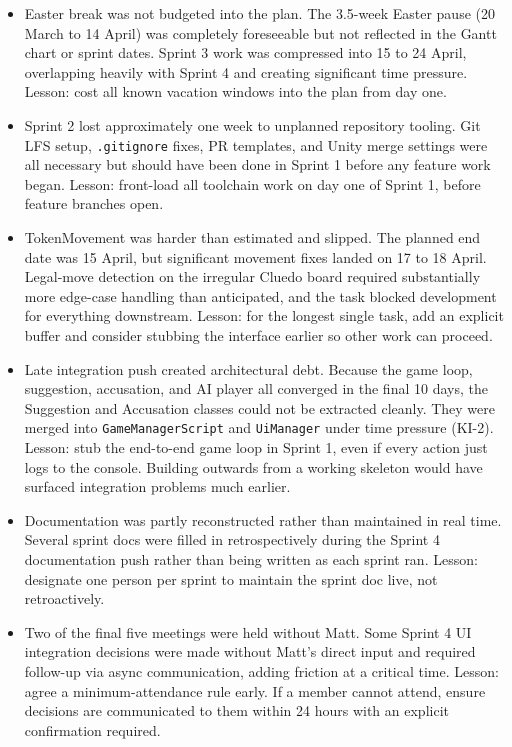 \begin{itemize}
    \item Easter break was not budgeted into the plan. The 3.5-week Easter pause (20 March to 14 April) was completely foreseeable but not reflected in the Gantt chart or sprint dates. Sprint 3 work was compressed into 15 to 24 April, overlapping heavily with Sprint 4 and creating significant time pressure. Lesson: cost all known vacation windows into the plan from day one.
    \item Sprint 2 lost approximately one week to unplanned repository tooling. Git LFS setup, \texttt{.gitignore} fixes, PR templates, and Unity merge settings were all necessary but should have been done in Sprint 1 before any feature work began. Lesson: front-load all toolchain work on day one of Sprint 1, before feature branches open.
    \item TokenMovement was harder than estimated and slipped. The planned end date was 15 April, but significant movement fixes landed on 17 to 18 April. Legal-move detection on the irregular Cluedo board required substantially more edge-case handling than anticipated, and the task blocked development for everything downstream. Lesson: for the longest single task, add an explicit buffer and consider stubbing the interface earlier so other work can proceed.
    \item Late integration push created architectural debt. Because the game loop, suggestion, accusation, and AI player all converged in the final 10 days, the Suggestion and Accusation classes could not be extracted cleanly. They were merged into \texttt{GameManagerScript} and \texttt{UiManager} under time pressure (KI-2). Lesson: stub the end-to-end game loop in Sprint 1, even if every action just logs to the console. Building outwards from a working skeleton would have surfaced integration problems much earlier.
    \item Documentation was partly reconstructed rather than maintained in real time. Several sprint docs were filled in retrospectively during the Sprint 4 documentation push rather than being written as each sprint ran. Lesson: designate one person per sprint to maintain the sprint doc live, not retroactively.
    \item Two of the final five meetings were held without Matt. Some Sprint 4 UI integration decisions were made without Matt's direct input and required follow-up via async communication, adding friction at a critical time. Lesson: agree a minimum-attendance rule early. If a member cannot attend, ensure decisions are communicated to them within 24 hours with an explicit confirmation required.

\end{itemize}
